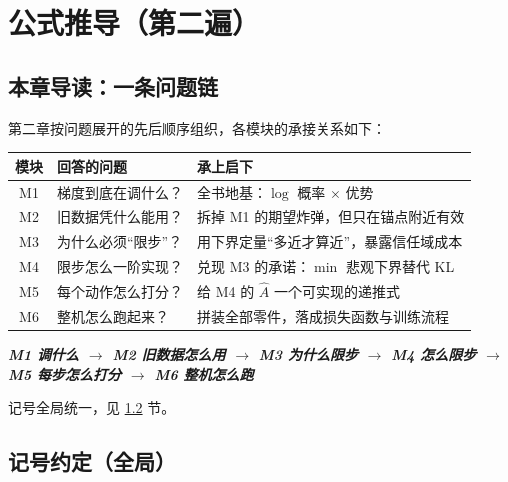 \documentclass[UTF8,12pt,a4paper]{ctexrep}
\newcommand{\flow}[1]{\par\medskip\noindent
  \begin{tcolorbox}[colback=main!6,colframe=main!6,boxrule=0pt,arc=2pt,
    left=8pt,right=8pt,top=5pt,bottom=5pt,halign=center,
    before skip=8pt,after skip=8pt]
    \color{main!85!black}\bfseries #1
  \end{tcolorbox}\par\medskip}
\begin{document}
\chapter{公式推导（第二遍）}

\section{本章导读：一条问题链}

第二章按问题展开的先后顺序组织，各模块的承接关系如下：

\begin{center}
\small
{}
\begin{tabular}{c|p{4.6cm}|p{4.8cm}}
\toprule
\textbf{模块} & \textbf{回答的问题} & \textbf{承上启下}\\
\midrule
M1 & 梯度到底在调什么？ & 全书地基：$\log$ 概率 $\times$ 优势\\
M2 & 旧数据凭什么能用？ & 拆掉 M1 的期望炸弹，但只在锚点附近有效\\
M3 & 为什么必须``限步''？ & 用下界定量``多近才算近''，暴露信任域成本\\
M4 & 限步怎么一阶实现？ & 兑现 M3 的承诺：$\min$ 悲观下界替代 KL\\
M5 & 每个动作怎么打分？ & 给 M4 的 $\hat{A}$ 一个可实现的递推式\\
M6 & 整机怎么跑起来？ & 拼装全部零件，落成损失函数与训练流程\\
\bottomrule
\end{tabular}
\end{center}

\flow{\emph{M1 调什么 $\to$ M2 旧数据怎么用 $\to$ M3 为什么限步 $\to$ M4 怎么限步 $\to$ M5 每步怎么打分 $\to$ M6 整机怎么跑}}

记号全局统一，见 \ref{sec:notation} 节。

\section{记号约定（全局）}
\label{sec:notation}
\end{document}

